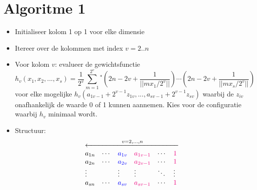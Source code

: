 \documentclass[a4paper, 12pt]{article}
\begin{document}
\section{Algoritme 1}
\begin{itemize}
\item Initialiseer kolom 1 op 1 voor elke dimensie
\item Itereer over de kolommen met index $v=2..n$
\item Voor kolom $v$: evalueer de gewichtsfunctie
\begin{equation}
h_v(x_1,x_2,...,x_s)=\frac{1}{2^v}\sum_{m=1}^{2^v}{}^*\left(2n-2v+\frac{1}{||mx_1/2^v||}\right)\cdots\left(2n-2v+\frac{1}{||mx_s/2^v||}\right)
\end{equation}
voor elke mogelijke ${h_v(a_{1v-1}+2^{v-1}z_{1v},...,a_{sv-1}+2^{v-1}z_{sv})}$ waarbij de $z_{iv}$ onafhankelijk de waarde 0 of 1 kunnen aannemen. Kies voor de configuratie waarbij $h_v$ minimaal wordt.
\item Structuur:
\begin{equation}
\begin{array}{llllll}
\multicolumn{6}{c}{\xleftarrow{\mbox{\hspace{50pt}}v=2,...,n\mbox{\hspace{50pt}}}} \\
a_{1n} & \cdots & \mbox{\textcolor{Blue}{$a_{1v}$}} & \mbox{\textcolor{RubineRed}{$a_{1v-1}$}} & \cdots & \mbox{\textcolor{RubineRed}{$1$}} \\
a_{2n} & \cdots & \mbox{\textcolor{Blue}{$a_{2v}$}} & \mbox{\textcolor{RubineRed}{$a_{2v-1}$}} & \cdots & 
\mbox{\textcolor{RubineRed}{$1$}} \\
\vdots & & \vdots & \vdots & \ddots & \vdots \\
a_{sn} & \cdots & \mbox{\textcolor{Blue}{$a_{sv}$}} & \mbox{\textcolor{RubineRed}{$a_{sv-1}$}} & \cdots &
\mbox{\textcolor{RubineRed}{$1$}} \\
\end{array}
\end{equation}
\end{itemize}
\end{document}
